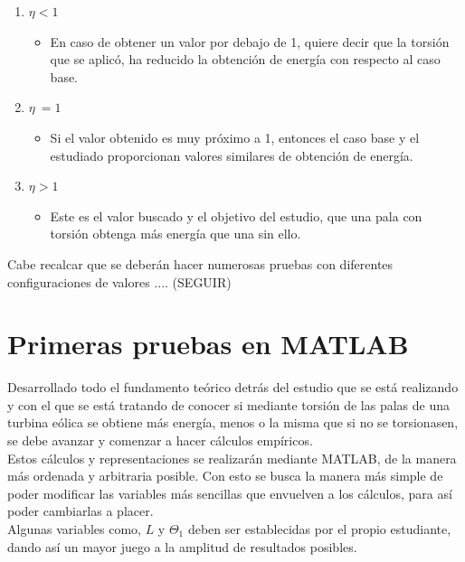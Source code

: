 \begin{enumerate}
    \item $\eta < 1$
        \begin{itemize}
            \item En caso de obtener un valor por debajo de 1, quiere decir que la torsión que se aplicó, ha reducido la obtención de energía con respecto al caso base. 
        \end{itemize}
    \item $\eta ~= 1$
        \begin{itemize}
            \item Si el valor obtenido es muy próximo a 1, entonces el caso base y el estudiado proporcionan valores similares de obtención de energía.
        \end{itemize}
    \item $\eta > 1$
        \begin{itemize}
            \item Este es el valor buscado y el objetivo del estudio, que una pala con torsión obtenga más energía que una sin ello.
        \end{itemize}
\end{enumerate}

Cabe recalcar que se deberán hacer numerosas pruebas con diferentes configuraciones de valores .... (SEGUIR)
 
\section{Primeras pruebas en MATLAB}

Desarrollado todo el fundamento teórico detrás del estudio que se está realizando y con el que se está tratando de conocer si mediante torsión de las palas de una turbina eólica se obtiene más energía, menos o la misma que si no se torsionasen, se debe avanzar y comenzar a hacer cálculos empíricos. \\

Estos cálculos y representaciones se realizarán mediante MATLAB, de la manera más ordenada y arbitraria posible. Con esto se busca la manera más simple de poder modificar las variables más sencillas que envuelven a los cálculos, para así poder cambiarlas a placer. \\

Algunas variables como, $L$ y $\Theta_1$ deben ser establecidas por el propio estudiante, dando así un mayor juego a la amplitud de resultados posibles. \\